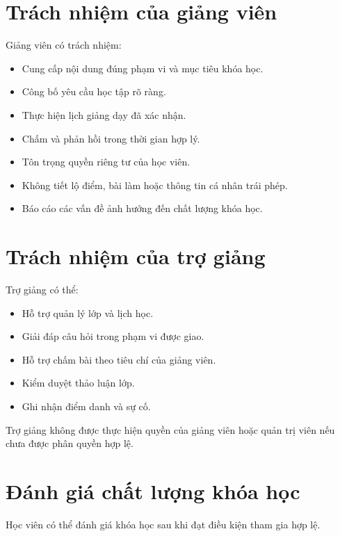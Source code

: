 \documentclass[12pt,a4paper]{article}
\begin{document}
\section{Trách nhiệm của giảng viên}

Giảng viên có trách nhiệm:

\begin{itemize}
    \item Cung cấp nội dung đúng phạm vi và mục tiêu khóa học.
    \item Công bố yêu cầu học tập rõ ràng.
    \item Thực hiện lịch giảng dạy đã xác nhận.
    \item Chấm và phản hồi trong thời gian hợp lý.
    \item Tôn trọng quyền riêng tư của học viên.
    \item Không tiết lộ điểm, bài làm hoặc thông tin cá nhân trái phép.
    \item Báo cáo các vấn đề ảnh hưởng đến chất lượng khóa học.
\end{itemize}

\section{Trách nhiệm của trợ giảng}

Trợ giảng có thể:

\begin{itemize}
    \item Hỗ trợ quản lý lớp và lịch học.
    \item Giải đáp câu hỏi trong phạm vi được giao.
    \item Hỗ trợ chấm bài theo tiêu chí của giảng viên.
    \item Kiểm duyệt thảo luận lớp.
    \item Ghi nhận điểm danh và sự cố.
\end{itemize}

Trợ giảng không được thực hiện quyền của giảng viên hoặc quản trị viên
nếu chưa được phân quyền hợp lệ.

\section{Đánh giá chất lượng khóa học}

Học viên có thể đánh giá khóa học sau khi đạt điều kiện tham gia hợp lệ.
\end{document}
